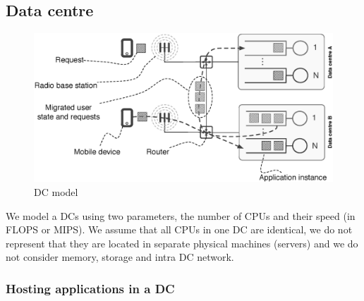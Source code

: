 \subsection{Data centre}

\begin{figure}[tb]
	\centering
	\includegraphics[width=0.8\linewidth]{fig_dc_model_horizontal.eps} 
	\caption{\ac{DC} model}
	\label{fig:dc_model}
\end{figure}

We model a \ac{DC}s using two parameters, the number of CPUs and their speed (in FLOPS or MIPS).
We assume that all CPUs in one \ac{DC} are identical, we do not represent that they are located in separate physical machines (servers) and we do not consider memory, storage and intra \ac{DC} network.



\subsubsection{Hosting applications in a \ac{DC}}

